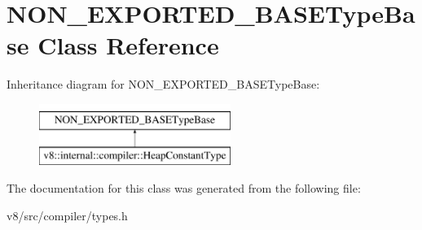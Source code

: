 \hypertarget{classNON__EXPORTED__BASETypeBase}{}\section{N\+O\+N\+\_\+\+E\+X\+P\+O\+R\+T\+E\+D\+\_\+\+B\+A\+S\+E\+Type\+Base Class Reference}
\label{classNON__EXPORTED__BASETypeBase}
Inheritance diagram for N\+O\+N\+\_\+\+E\+X\+P\+O\+R\+T\+E\+D\+\_\+\+B\+A\+S\+E\+Type\+Base\+:\begin{figure}[H]
\begin{center}
\leavevmode
\includegraphics[height=2.000000cm]{classNON__EXPORTED__BASETypeBase}
\end{center}
\end{figure}


The documentation for this class was generated from the following file\+:\begin{DoxyCompactItemize}
\item 
v8/src/compiler/types.\+h\end{DoxyCompactItemize}
